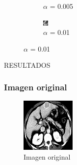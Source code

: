 \documentclass[11pt]{beamer}
\begin{document}
\begin{frame}
\begin{figure}[H]
\begin{subfigure}[h]{0.30\textwidth}
        \caption{$\alpha$ = 0.005}
        \label{fig:alpha = 0.005}
    \end{subfigure}%
    \hfill
    \begin{subfigure}[h]{0.3\textwidth} 
        \includegraphics[width=\textwidth]{img/tomo_ruido01.png}
        \caption{$\alpha$ = 0.01}
        \label{fig: alpha = 0.01}
    \end{subfigure}


	\end{figure}
\end{frame}




\begin{frame}{RESULTADOS}
    \frametitle{Imagen original}
    \begin{figure}
    \centering
            \includegraphics[scale=1]{img/tomo.png}
            \caption{Imagen original}
            \label{fig:original}
    \end{figure}
\end{frame}
    
\end{document}
